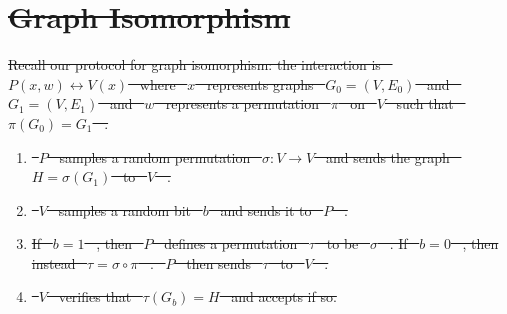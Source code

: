 \documentclass[12pt]{tufte-book}
\providecommand{\DIFdel}[1]{{\protect\color{red}\sout{#1}}}                      %
\providecommand{\DIFdelbegin}{} %
\providecommand{\DIFdelend}{} %
\newcommand{\DIFscaledelfig}{0.5}
\newlength{\DIFdelgraphicswidth} %
\newlength{\DIFdelgraphicsheight} %
\newcommand{\DIFdelincludegraphics}[2][]{%
\sbox{\DIFdelgraphicsbox}{\DIFOincludegraphics[#1]{#2}}%
\settoboxwidth{\DIFdelgraphicswidth}{\DIFdelgraphicsbox} %
\settoboxtotalheight{\DIFdelgraphicsheight}{\DIFdelgraphicsbox} %
\scalebox{\DIFscaledelfig}{%
\parbox[b]{\DIFdelgraphicswidth}{\usebox{\DIFdelgraphicsbox}\\[-\baselineskip] \rule{\DIFdelgraphicswidth}{0em}}\llap{\resizebox{\DIFdelgraphicswidth}{\DIFdelgraphicsheight}{%
\setlength{\unitlength}{\DIFdelgraphicswidth}%
\begin{picture}(1,1)%
\thicklines\linethickness{2pt} %
{\color[rgb]{1,0,0}\put(0,0){\framebox(1,1){}}}%
{\color[rgb]{1,0,0}\put(0,0){\line( 1,1){1}}}%
{\color[rgb]{1,0,0}\put(0,1){\line(1,-1){1}}}%
\end{picture}%
}\hspace*{3pt}}} %
} %
\DeclareRobustCommand{\DIFdelbegin}{\DIFOdelbegin \let\includegraphics\DIFdelincludegraphics} %
\DeclareRobustCommand{\DIFdelend}{\DIFOaddend \let\includegraphics\DIFOincludegraphics} %
\begin{document}
\DIFdelbegin \section{\DIFdel{Graph Isomorphism}}
\addtocounter{section}{-1}%
\DIFdelend %

\DIFdelbegin \DIFdel{Recall our protocol for graph isomorphism: the interaction is \mbox{%
$P(x,w) \leftrightarrow V(x)$
}%
where \mbox{%
$x$
}%
represents graphs \mbox{%
$G_0 = (V, E_0)$
}%
and \mbox{%
$G_1 = (V, E_1)$
}%
and \mbox{%
$w$
}%
represents a permutation \mbox{%
$\pi$
}%
on \mbox{%
$V$
}%
such that \mbox{%
$\pi (G_0) = G_1$
}%
.
    }%

\begin{enumerate}%
\item%
\DIFdel{\mbox{%
$P$
}%
samples a random permutation \mbox{%
$\sigma: V \to V$
}%
and sends the graph \mbox{%
$H = \sigma(G_1)$
}%
to \mbox{%
$V$
}%
.
    }%

\item%
\DIFdel{\mbox{%
$V$
}%
samples a random bit \mbox{%
$b$
}%
and sends it to \mbox{%
$P$
}%
.
    }%

\item%
\DIFdel{If \mbox{%
$b = 1$
}%
, then \mbox{%
$P$
}%
defines a permutation \mbox{%
$\tau$
}%
to be \mbox{%
$\sigma$
}%
. If \mbox{%
$b = 0$
}%
, then instead \mbox{%
$\tau = \sigma \circ \pi$
}%
. \mbox{%
$P$
}%
then sends \mbox{%
$\tau$
}%
to \mbox{%
$V$
}%
.
    }%

\item%
\DIFdel{\mbox{%
$V$
}%
verifies that \mbox{%
$\tau(G_b) = H$
}%
and accepts if so.
    }%


\end{enumerate}%
\end{document}
